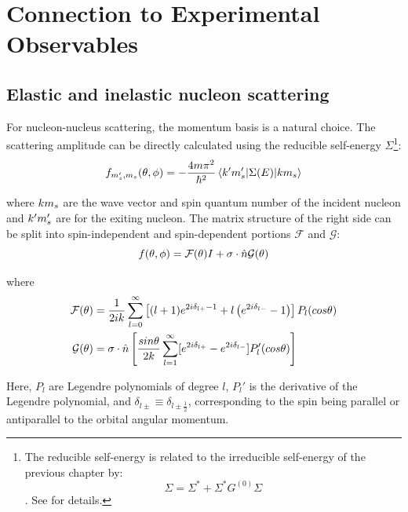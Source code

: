 \section{Connection to Experimental Observables}

\subsection{Elastic and inelastic nucleon scattering}
For nucleon-nucleus scattering, the momentum basis is a natural choice. The scattering amplitude can be directly calculated using the
reducible self-energy $\Sigma$\footnote{The reducible self-energy is related to the irreducible
    self-energy of the previous chapter by:
    \begin{equation}
        \Sigma = \Sigma^{*} + \Sigma^{*}G^{(0)}\Sigma
    \end{equation}. See \cite{MahzoonPhDThesis} for details.}:
\begin{equation}
    f_{m'_{s},m_{s}}(\theta,\phi) =
    -\frac{4m\pi^{2}}{\hbar^{2}}\braket{\boldmath{k}'m'_{s}|\Sigma(E)|\boldmath{k}m_{s}}
\end{equation}

\noindent
where $\boldmath{k}m_{s}$ are the wave vector and spin quantum number of the incident nucleon and
$\boldmath{k'}m'_{s}$ are for the exiting nucleon. The matrix structure of the right side can be
split into spin-independent and spin-dependent portions $\mathcal{F}$ and $\mathcal{G}$:
\begin{equation}
    f(\theta,\phi) = \mathcal{F}(\theta)I + \sigma\cdot\boldmath{\hat{n}}\mathcal{G}(\theta)
\end{equation}

\noindent
where
\begin{equation}
    \begin{split}
        \mathcal{F}(\theta) & = \frac{1}{2ik}\sum_{l=0}^{\infty}\left[(l+1)e^{2i\delta_{l+} - 1} +
        l\left(e^{2i\delta_{l-}}-1\right)\right]P_{l}(cos\theta)\\
        \mathcal{G}(\theta) & = \sigma\cdot\boldmath{\hat{n}}\left[\frac{sin\theta}{2k}\sum_{l=1}^{\infty}[e^{2i\delta_{l+}}-e^{2i\delta_{l-}}]P'_{l}(cos\theta)\right]
    \end{split}
\end{equation}

\noindent
Here, $P_{l}$ are Legendre polynomials of degree $l$, $P_{l}'$ is the derivative of the Legendre
polynomial, and $\delta_{l\pm} \equiv \delta_{l\pm\frac{1}{2}}$, corresponding to the spin being
parallel or antiparallel to the orbital angular momentum.

